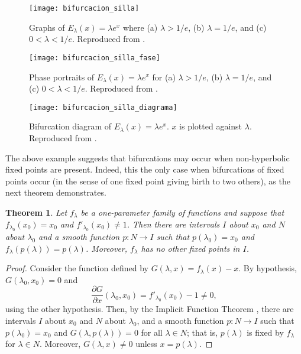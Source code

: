 \documentclass[10pt,twoside,titlepage]{book}
\numberwithin{equation}{chapter}
\numberwithin{figure}{chapter}
\numberwithin{table}{chapter}
\theoremstyle{plain}%
\newtheorem{thm}{Theorem}[chapter]
\theoremstyle{definition}
\theoremstyle{remark}
\begin{document}
\begin{figure}
	\centering
	\texttt{[image: bifurcacion\_silla]}
	\caption{Graphs of $E_{\lambda}(x)=\lambda e^{x}$ where (a) $\lambda>1/e$, (b) $\lambda=1/e$, and (c) $0<\lambda<1/e$. Reproduced from \cite{DevaneyIntroCDD}.}
	\label{fig:Saddle-Node}
\end{figure}

\begin{figure}
	\centering
	\texttt{[image: bifurcacion\_silla\_fase]}
	\caption{Phase portraits of $E_{\lambda}(x)=\lambda e^{x}$ for (a) $\lambda>1/e$, (b) $\lambda=1/e$, and (c) $0<\lambda<1/e$. Reproduced from \cite{DevaneyIntroCDD}.}
	\label{fig:Saddle-Node-PhaseDiag}
\end{figure}

\begin{figure}
	\centering
	\texttt{[image: bifurcacion\_silla\_diagrama]}
	\caption{Bifurcation diagram of $E_{\lambda}(x)=\lambda e^{x}$. $x$ is plotted against $\lambda$. Reproduced from \cite{DevaneyIntroCDD}.}
	\label{fig:Bifurcation-Diagram-Example}
\end{figure}

The above example suggests that bifurcations may occur when non-hyperbolic fixed points are present. Indeed, this the only case when bifurcations of fixed points occur (in the sense of one fixed point giving birth to two others), as the next theorem demonstrates.

\begin{thm}
	\label{thm:fixedp}
	Let $f_{\lambda}$ be a one-parameter family of functions and suppose that $f_{\lambda_0}(x_0)=x_0$ and $f'_{\lambda_0}(x_0)\neq 1$. Then there are intervals $I$ about $x_0$ and $N$ about $\lambda_0$ and a smooth function $p:N\rightarrow I$ such that $p(\lambda_0)=x_0$ and $f_{\lambda}(p(\lambda))=p(\lambda)$. Moreover, $f_{\lambda}$ has no other fixed points in $I$.
\end{thm}
\begin{proof}
	Consider the function defined by $G(\lambda,x)=f_{\lambda}(x)-x$. By hypothesis, $G(\lambda_0,x_0)=0$ and
	\begin{equation}
		\frac{\partial G}{\partial x}(\lambda_0,x_0)=f'_{\lambda_0}(x_0)-1\neq 0,
	\end{equation}
	using the other hypothesis. Then, by the Implicit Function Theorem \cite{Marsden}, there are intervals $I$ about $x_0$ and $N$ about $\lambda_0$, and a smooth function $p:N\rightarrow I$ such that $p(\lambda_0)=x_0$ and $G(\lambda,p(\lambda))=0$ for all $\lambda\in N$; that is, $p(\lambda)$ is fixed by $f_{\lambda}$ for $\lambda\in N$. Moreover, $G(\lambda,x)\neq 0$ unless $x=p(\lambda)$.
\end{proof}
\end{document}
